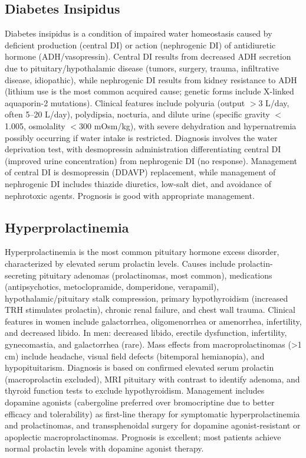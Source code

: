 \subsection{Diabetes Insipidus}
\label{sec:Diabetes Insipidus}
Diabetes insipidus is a condition of impaired water homeostasis caused by deficient production (central DI) or action (nephrogenic DI) of antidiuretic hormone (ADH/vasopressin). Central DI results from decreased ADH secretion due to pituitary/hypothalamic disease (tumors, surgery, trauma, infiltrative disease, idiopathic), while nephrogenic DI results from kidney resistance to ADH (lithium use is the most common acquired cause; genetic forms include X-linked aquaporin-2 mutations). Clinical features include polyuria (output $>$3 L/day, often 5--20 L/day), polydipsia, nocturia, and dilute urine (specific gravity $<$1.005, osmolality $<$300 mOsm/kg), with severe dehydration and hypernatremia possibly occurring if water intake is restricted. Diagnosis involves the water deprivation test, with desmopressin administration differentiating central DI (improved urine concentration) from nephrogenic DI (no response). Management of central DI is desmopressin (DDAVP) replacement, while management of nephrogenic DI includes thiazide diuretics, low-salt diet, and avoidance of nephrotoxic agents. Prognosis is good with appropriate management.

\subsection{Hyperprolactinemia}
\label{sec:Hyperprolactinemia}
Hyperprolactinemia is the most common pituitary hormone excess disorder, characterized by elevated serum prolactin levels. Causes include prolactin-secreting pituitary adenomas (prolactinomas, most common), medications (antipsychotics, metoclopramide, domperidone, verapamil), hypothalamic/pituitary stalk compression, primary hypothyroidism (increased TRH stimulates prolactin), chronic renal failure, and chest wall trauma. Clinical features in women include galactorrhea, oligomenorrhea or amenorrhea, infertility, and decreased libido. In men: decreased libido, erectile dysfunction, infertility, gynecomastia, and galactorrhea (rare). Mass effects from macroprolactinomas (>1 cm) include headache, visual field defects (bitemporal hemianopia), and hypopituitarism. Diagnosis is based on confirmed elevated serum prolactin (macroprolactin excluded), MRI pituitary with contrast to identify adenoma, and thyroid function tests to exclude hypothyroidism. Management includes dopamine agonists (cabergoline preferred over bromocriptine due to better efficacy and tolerability) as first-line therapy for symptomatic hyperprolactinemia and prolactinomas, and transsphenoidal surgery for dopamine agonist-resistant or apoplectic macroprolactinomas. Prognosis is excellent; most patients achieve normal prolactin levels with dopamine agonist therapy.

